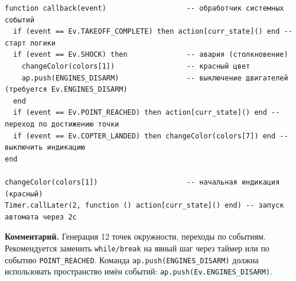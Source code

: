 \begin{verbatim}
function callback(event)                   -- обработчик системных событий
  if (event == Ev.TAKEOFF_COMPLETE) then action[curr_state]() end -- старт логики
  if (event == Ev.SHOCK) then              -- авария (столкновение)
    changeColor(colors[1])                 -- красный цвет
    ap.push(ENGINES_DISARM)                -- выключение двигателей (требуется Ev.ENGINES_DISARM)
  end
  if (event == Ev.POINT_REACHED) then action[curr_state]() end -- переход по достижению точки
  if (event == Ev.COPTER_LANDED) then changeColor(colors[7]) end -- выключить индикацию
end

changeColor(colors[1])                     -- начальная индикация (красный)
Timer.callLater(2, function () action[curr_state]() end) -- запуск автомата через 2с
\end{verbatim}
\textbf{Комментарий.} Генерация 12 точек окружности, переходы по событиям. Рекомендуется заменить \texttt{while/break} на явный шаг через таймер или по событию \texttt{POINT\_REACHED}. Команда \texttt{ap.push(ENGINES\_DISARM)} должна использовать пространство имён событий: \texttt{ap.push(Ev.ENGINES\_DISARM)}.

